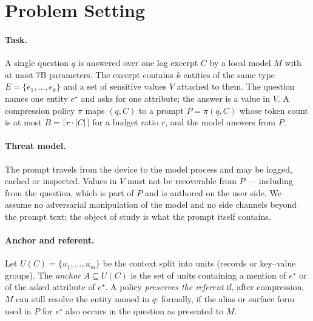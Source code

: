 \documentclass[conference]{IEEEtran}
\begin{document}
\section{Problem Setting}
\label{sec:problem}

\paragraph{Task.}
A single question $q$ is answered over one log excerpt $C$ by a local model $M$ with at most
7B parameters. The excerpt contains $k$ entities of the same type
$E=\{e_1,\dots,e_k\}$ and a set of sensitive values $V$ attached to them. The question names
one entity $e^\star$ and asks for one attribute; the answer is a value in $V$. A compression
policy $\pi$ maps $(q, C)$ to a prompt $P=\pi(q,C)$ whose token count is at most
$B=\lceil r\cdot|C|\rceil$ for a budget ratio $r$, and the model answers from $P$.

\paragraph{Threat model.}
The prompt travels from the device to the model process and may be logged, cached or
inspected. Values in $V$ must not be recoverable from $P$ --- including from the question,
which is part of $P$ and is authored on the user side. We assume no adversarial manipulation of
the model and no side channels beyond the prompt text; the object of study is what the prompt
itself contains.

\paragraph{Anchor and referent.}
Let $U(C)=\{u_1,\dots,u_m\}$ be the context split into units (records or key--value groups).
The \emph{anchor} $A\subseteq U(C)$ is the set of units containing a mention of $e^\star$ or of
the asked attribute of $e^\star$. A policy \emph{preserves the referent} if, after compression,
$M$ can still resolve the entity named in $q$: formally, if the alias or surface form used in
$P$ for $e^\star$ also occurs in the question as presented to $M$.
\end{document}
